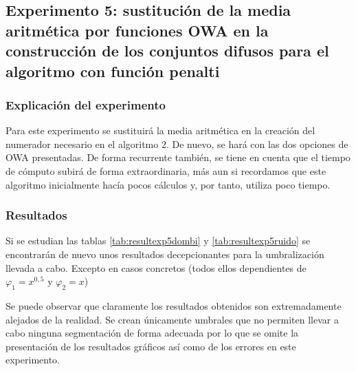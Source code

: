 \subsection{Experimento 5: sustitución de la media aritmética por funciones OWA en la construcción de los conjuntos difusos para el algoritmo con función penalti}

\subsubsection{Explicación del experimento}
Para este experimento se sustituirá la media aritmética en la creación del numerador necesario en el algoritmo 2. De nuevo, se hará con las dos opciones de OWA presentadas. De forma recurrente también, se tiene en cuenta que el tiempo de cómputo subirá de forma extraordinaria, más aun si recordamos que este algoritmo inicialmente hacía pocos cálculos y, por tanto, utiliza poco tiempo.

\subsubsection{Resultados}

Si se estudian las tablas \ref{tab:resultexp5dombi} y \ref{tab:resultexp5ruido} se encontrarán de nuevo unos resultados decepcionantes para la umbralización llevada a cabo. Excepto en casos concretos (todos ellos dependientes de $\varphi_1=x^{0,5} \text{ y }\varphi_2=x$)

Se puede observar que claramente los resultados obtenidos son extremadamente alejados de la realidad. Se crean únicamente umbrales que no permiten llevar a cabo ninguna segmentación de forma adecuada por lo que se omite la presentación de los resultados gráficos así como de los errores en este experimento.

